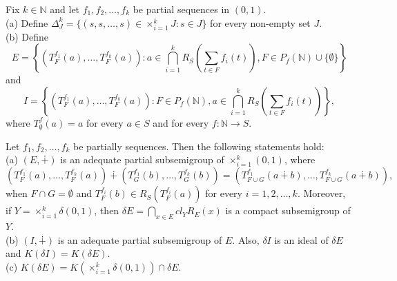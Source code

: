 \documentclass[twoside,11pt]{article}
\begin{document}
\begin{definition}
	Fix $k\in\mathbb{N}$ and let $f_1,f_2,\dots,f_k$ be partial sequences in $(0,1)$.\\
	(a) Define $\Delta^k_J = \{(s,s,\dots,s) \in \times_{i=1}^k J : s \in J\}$ for every non-empty set $J$.\\	
	(b) Define 
	\[
	E = \left\{ (T_F^{f_1}(a),\dots,T_F^{f_k}(a)) : a \in \bigcap_{i=1}^k R_S\left(\sum_{t\in F}f_i(t)\right), F \in P_f(\mathbb{N}) \cup \{\emptyset\} \right\}
	\]
	and 
	\[
	I = \left\{ (T_F^{f_1}(a),\dots,T_F^{f_k}(a)) : F \in P_f(\mathbb{N}), a \in \bigcap_{i=1}^k R_S\left(\sum_{t\in F}f_i(t)\right) \right\},
	\]	 
	where $T_\emptyset^f(a) = a$ for every $a\in S$ and for every $f:{\mathbb{N}}\to S$.
\end{definition}

\begin{theorem} \label{recurrent}
	Let $f_1,f_2,\dots,f_k$ be partially sequences. Then the following statements hold:\\
	(a) $(E,\dotplus)$ is an adequate partial subsemigroup of $\times_{i=1}^k(0,1)$, where 
	\[
	(T_F^{f_1}(a),\dots,T_F^{f_k}(a)) \dotplus (T_G^{f_1}(b),\dots,T_G^{f_k}(b)) = (T_{F\cup G}^{f_1}(a \dotplus b),\dots,T_{F\cup G}^{f_k}(a \dotplus b)),
	\]  
	when $F\cap G=\emptyset$ and $T_F^{f_i}(b) \in R_S(T_F^{f_i}(a))$ for every $i=1,2,\dots, k$. Moreover, if $Y=\times_{i=1}^k\delta (0,1)$, then $\delta E = \bigcap_{x\in E} cl_Y R_E(x)$ is a compact subsemigroup of $Y$.\\
	(b) $(I,\dotplus)$ is an adequate partial subsemigroup of $E$. Also, $\delta I$ is an ideal of $\delta E$ and $K(\delta I) = K(\delta E)$.\\
	(c) $K(\delta E) = K\left( \times_{i=1}^k\delta (0,1) \right) \cap \delta E$.	
\end{theorem}
\end{document}
